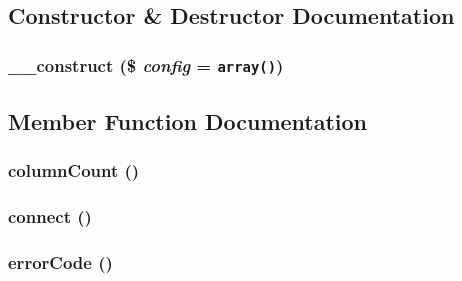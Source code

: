 \subsection{Constructor \& Destructor Documentation}
\hypertarget{class_cahnory_d_b___access_f7f9493844d2d66e924e3c1df51ce616}{
\subsubsection[{\_\-\_\-construct}]{\setlength{\rightskip}{0pt plus 5cm}\_\-\_\-construct (\$ {\em config} = {\tt array()})}}
\label{class_cahnory_d_b___access_f7f9493844d2d66e924e3c1df51ce616}




\subsection{Member Function Documentation}
\hypertarget{class_cahnory_d_b___access_1cd0e18d5cc164a888f7bb39d5811dd6}{
\subsubsection[{columnCount}]{\setlength{\rightskip}{0pt plus 5cm}columnCount ()}}
\label{class_cahnory_d_b___access_1cd0e18d5cc164a888f7bb39d5811dd6}


\hypertarget{class_cahnory_d_b___access_78572828d11dcdf2a498497d9001d557}{
\subsubsection[{connect}]{\setlength{\rightskip}{0pt plus 5cm}connect ()}}
\label{class_cahnory_d_b___access_78572828d11dcdf2a498497d9001d557}


\hypertarget{class_cahnory_d_b___access_928a98b280c4dd8971ce6998eb157409}{
\subsubsection[{errorCode}]{\setlength{\rightskip}{0pt plus 5cm}errorCode ()}}
\label{class_cahnory_d_b___access_928a98b280c4dd8971ce6998eb157409}


